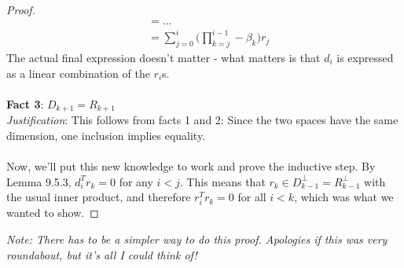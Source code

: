 \documentclass[12pt]{article}
\newenvironment{problem}[2][Problem]{\begin{trivlist}
\item[\hskip \labelsep {\bfseries #1}\hskip \labelsep {\bfseries #2.}]}{\end{trivlist}}
\theoremstyle{definition}
\theoremstyle{definition}
\theoremstyle{definition}
\theoremstyle{definition}
\begin{document}
\begin{problem}{9.20}
\begin{proof}
\begin{align*}
&= ... \\
&= \sum_{j=0}^i \bigg( \prod_{k=j}^{i-1} -\beta_{k} \bigg) r_j 
\end{align*}
The actual final expression doesn't matter - what matters is that $d_i$ is expressed as a linear combination of the $r_i$s. 
\\
\\
\textbf{Fact 3}: $D_{k+1} = R_{k+1}$ \\
\textit{Justification}: This follows from facts 1 and 2: Since the two spaces have the same dimension, one inclusion implies equality. \\
\\
Now, we'll put this new knowledge to work and prove the inductive step. By Lemma 9.5.3, $d_i^Tr_k = 0$ for any $i < j$. This means that $r_k \in D_{k-1}^\perp = R_{k-1}^\perp$ with the usual inner product, and therefore $r_i^Tr_k = 0$ for all $i < k$, which was what we wanted to show. 
\end{proof}
\end{problem}
\textit{Note: There has to be a simpler way to do this proof. Apologies if this was very roundabout, but it's all I could think of!}
\end{document}

